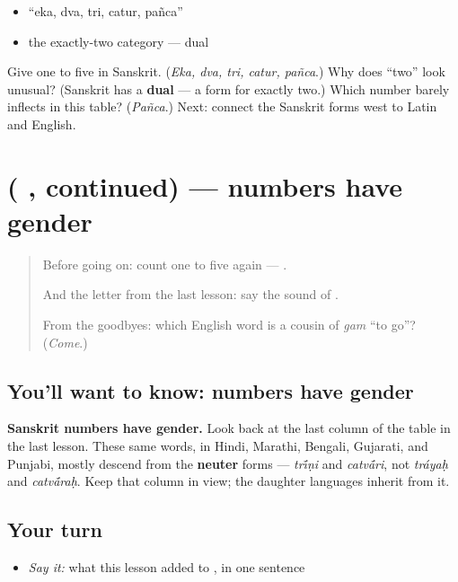 \begin{itemize}
\raggedright
  \item \textquotedblleft{}eka, dva, tri, catur, pañca\textquotedblright{}
  \item the exactly-two category — dual
\end{itemize}

\begin{tcolorbox}[breakable,colback=teal!4,colframe=teal!35!black,title={Before you move on}]
Give one to five in Sanskrit. (\emph{Eka, dva, tri, catur, pañca}.) Why does \textquotedblleft{}two\textquotedblright{} look unusual? (Sanskrit has a \textbf{dual} — a form for exactly two.) Which number barely inflects in this table? (\emph{Pañca}.) Next: connect the Sanskrit forms west to Latin and English.
\end{tcolorbox}
\section[\texorpdfstring{(\sk{एक} \sk{द्व} \sk{त्रि} \sk{चतुर्} \sk{पञ्च}, continued)}{(एक द्व त्रि चतुर् पञ्च, continued)}]{(    , continued) — numbers have gender}

\label{lesson:SA-C06-numbers-1-5-more}



\begin{quote}
Before going on: count one to five again — \textbf{    }.

And the letter from the last lesson: say the sound of .

From the goodbyes: which English word is a cousin of \emph{gam} \textquotedblleft{}to go\textquotedblright{}? (\emph{Come}.)
\end{quote}

\subsection*{You'll want to know: numbers have gender}
\textbf{Sanskrit numbers have gender.} Look back at the last column of the table in the last lesson. These same words, in Hindi, Marathi, Bengali, Gujarati, and Punjabi, mostly descend from the \textbf{neuter} forms — \emph{tr\'{\={\i}}ṇi} and \emph{catv\'{\={a}}ri}, not \emph{tráyaḥ} and \emph{catv\'{\={a}}raḥ}. Keep that column in view; the daughter languages inherit from it.

\subsection*{Your turn}
\begin{itemize}
\raggedright
  \item \emph{Say it:} what this lesson added to \textbf{    }, in one sentence
\end{itemize}

